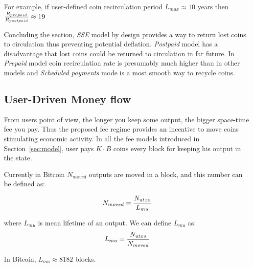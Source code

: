 \documentclass[]{article}   %
\newcommand{\authnote}[2]{\marginpar{\parbox{\marginparwidth}{\tiny %
  \textsf{#1 {\textcolor{blue}{notes: #2}}}}}%
  \textcolor{blue}{\textbf{\dag}}}
\newcommand{\authnote}[2]{
  \textsf{#1 \textcolor{blue}{: #2}}}
\newcommand{\authnote}[2]{}
\newcommand{\dnote}[1]{{\authnote{\textcolor{blue}{Dima notes}}{#1}}}
\newcommand{\esse}{\textit{SSE}}
\newcommand{\ignore}[1]{} %
\begin{document}
For example, if user-defined coin recirculation period $L_{max}\approx10$ years then ${R_{prepaid} \over R_{postpaid}} \approx 19$

Concluding the section, \esse{} model by design provides a way to return lost coins to circulation thus preventing potential deflation. \textit{Postpaid} model has a disadvantage  that lost coins could be returned to circulation in far future. In \textit{Prepaid} model coin recirculation rate is presumably much higher than in other models and \textit{Scheduled payments} mode is a most smooth way to recycle coins.



\subsection{User-Driven Money flow}
\label{sec:flow}

From users point of view, the longer you keep some output, the bigger space-time fee you pay. Thus the proposed fee regime provides an incentive to move coins stimulating economic activity. In all the fee models introduced in Section~\ref{sec:model}, user pays ${K \cdot B}$ coins every block for keeping his output in the state. 


\ignore{
  If he uses blockchain with output size \textit{B} is relatively small and do not depend on output value.

  To estimate money flow let's assume, that user will move his money when space-time fee will start dominate over other transactional costs \dnote{why?}. Thus we can estimate expected mean output lifetime as

  \begin{equation}
  \label{eq:ltmean}
  L_{mean}={f_p \over K \cdot B}
  \end{equation}
}

Currently in Bitcoin $N_{moved}$ outputs are moved in a block, and this number can be defined as: 

\begin{equation}
N_{moved} = {N_{utxo} \over L_{mu}} %
\end{equation}

where $L_{mu}$ is mean lifetime of an output. We can define $L_{mu}$ as:
\begin{equation}
L_{mu} = {N_{utxo} \over {N_{moved}}}
\end{equation}

In Bitcoin, $L_{mu} \approx 8182$ blocks.
\end{document}
